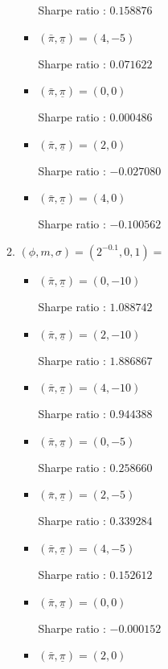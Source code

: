 \documentclass[12pt]{article}
\begin{document}
\begin{enumerate}
\begin{enumerate}
\begin{itemize}
Sharpe ratio : $0.158876$

\item $(\bar{\pi}, \underline{\pi}) = (4,-5)$

Sharpe ratio : $0.071622$

\item $(\bar{\pi}, \underline{\pi}) = (0,0)$

Sharpe ratio : $0.000486$

\item $(\bar{\pi}, \underline{\pi}) = (2,0)$

Sharpe ratio : $-0.027080$

\item $(\bar{\pi}, \underline{\pi}) = (4,0)$

Sharpe ratio : $-0.100562$

\end{itemize}

\newpage
\item$(\phi, m, \sigma) = (2^{-0.1},0,1) = $

\begin{itemize}

\item $(\bar{\pi}, \underline{\pi}) = (0,-10)$

Sharpe ratio : $1.088742$

\item $(\bar{\pi}, \underline{\pi}) = (2,-10)$

Sharpe ratio : $1.886867$

\item $(\bar{\pi}, \underline{\pi}) = (4,-10)$

Sharpe ratio : $0.944388$

\item $(\bar{\pi}, \underline{\pi}) = (0,-5)$

Sharpe ratio : $0.258660$

\item $(\bar{\pi}, \underline{\pi}) = (2,-5)$

Sharpe ratio : $0.339284$

\item $(\bar{\pi}, \underline{\pi}) = (4,-5)$

Sharpe ratio : $0.152612$

\item $(\bar{\pi}, \underline{\pi}) = (0,0)$

Sharpe ratio : $-0.000152$

\item $(\bar{\pi}, \underline{\pi}) = (2,0)$


\end{itemize}
\end{enumerate}
\end{enumerate}
\end{document}
